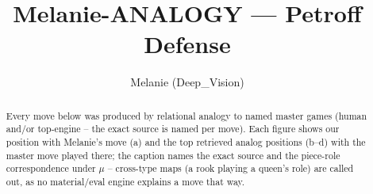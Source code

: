\documentclass[11pt]{article}
\title{Melanie-ANALOGY — Petroff Defense}
\author{Melanie (Deep\_Vision)}
\date{}
\begin{document}
\maketitle

\begin{abstract}Every move below was produced by relational analogy to named master games (human and/or top-engine -- the exact source is named per move). Each figure shows our position with Melanie's move (a) and the top retrieved analog positions (b--d) with the master move played there; the caption names the exact source and the piece-role correspondence under $\mu$ -- cross-type maps (a rook playing a queen's role) are called out, as no material/eval engine explains a move that way.\end{abstract}

\begin{figure}[p]\centering
\begin{subfigure}{0.46\textwidth}\centering
\resizebox{\linewidth}{!}{%
\newchessgame
\chessboard[
  setfen={r1bqkb1r/ppp2ppp/2n5/3p4/3PB3/5N2/PPP2PPP/RNBQK2R b KQkq - 0 7},
  showmover=false,
  pgfstyle=straightmove, color=movearrow, markmove={d5-e4}
]}
\caption{}
\end{subfigure}\hfill
\begin{subfigure}{0.46\textwidth}\centering
\resizebox{\linewidth}{!}{%
\newchessgame
\chessboard[
  setfen={r1bqkb1r/pppp1ppp/2n5/4P3/2BP1p2/4BN2/PPP3PP/RN1QK2R b KQkq - 0 7},
  showmover=false,
  pgfstyle=straightmove, color=movearrow, markmove={f4-e3}
]}
\caption{}
\end{subfigure}
\\[4pt]
\begin{subfigure}{0.46\textwidth}\centering
\resizebox{\linewidth}{!}{%
\newchessgame
\chessboard[
  setfen={r1bqkb1r/pppp1ppp/2n5/4P3/2BP1p2/4BN2/PPP3PP/RN1QK2R b KQkq - 0 7},
  showmover=false,
  pgfstyle=straightmove, color=movearrow, markmove={f4-e3}
]}
\caption{}
\end{subfigure}\hfill
\begin{subfigure}{0.46\textwidth}\centering
\resizebox{\linewidth}{!}{%
\newchessgame
\chessboard[
  setfen={rnbqk2r/ppp1nppp/8/3p4/1bPP4/2N5/PP3PPP/R1BQKBNR w KQkq - 3 6},
  showmover=false,
  pgfstyle=straightmove, color=movearrow, markmove={g1-f3}
]}
\caption{}
\end{subfigure}

\end{figure}
\end{document}
